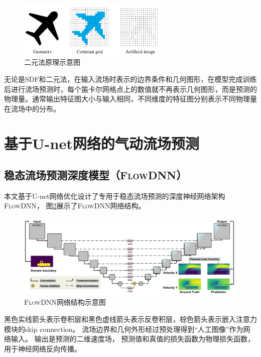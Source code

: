 \begin{figure}[htp]
	\centering
	\includegraphics[width=0.64\textwidth]{figures/binary.png}
	\caption{二元法原理示意图}
	\label{fig:binary}
\end{figure}


无论是SDF和二元法，在输入流场时表示的边界条件和几何图形，在模型完成训练后进行流场预测时，每个笛卡尔网格点上的数值就不再表示几何图形，而是预测的物理量。通常输出特征图大小与输入相同，不同维度的特征图分别表示不同物理量在流场中的分布。




\section{基于U-net网络的气动流场预测}



\subsection{稳态流场预测深度模型（\textsc{FlowDNN}）}
本文基于U-net网络优化设计了专用于稳态流场预测的深度神经网络架构\textsc{FlowDNN}，
图\ref{fig:flowdnn}展示了\textsc{FlowDNN}网络结构。


\begin{figure}[htp]
	\centering
	\includegraphics[width=0.99\textwidth]{figures/data/architecture.pdf}
	\caption{\textsc{FlowDNN}网络结构示意图}
	\label{fig:flowdnn}
\end{figure}

\noindent 黑色实线箭头表示卷积层和黑色虚线箭头表示反卷积层，棕色箭头表示嵌入注意力模块的skip connection。
流场边界和几何外形经过预处理得到“人工图像”作为网络输入。 输出是预测的二维速度场，
预测值和真值的损失函数为物理损失函数，用于神经网络反向传播。


